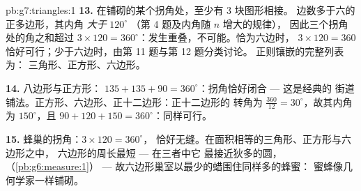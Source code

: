 \begin{solution}{pb:g7:triangles:1}
\textbf{13.} 在铺砌的某个拐角处，至少有 $3$ 块图形相接。
边数多于六的正多边形，其内角 \emph{大于} $120^\circ$
（第 4 题及内角随 $n$ 增大的规律），
因此三个拐角处的角之和超过
$3 \times 120 = 360^\circ$：发生重叠，不可能。恰为六边时，
$3 \times 120 = 360$ 恰好可行；少于六边时，由第 11 题与第 12 题分类讨论。
正则镶嵌的完整列表为：
三角形、正方形、六边形。

\textbf{14.} 八边形与正方形：
$135 + 135 + 90 = 360^\circ$：拐角恰好闭合 --- 这是经典的
街道铺法。正方形、六边形、正十二边形：正十二边形的
转角为 $\frac{360}{12} = 30^\circ$，故其内角为
$150^\circ$，且 $90 + 120 + 150 = 360^\circ$：同样可行。

\textbf{15.} 蜂巢的拐角：$3 \times 120 = 360^\circ$，
恰好无缝。在面积相等的三角形、正方形与六边形之中，
六边形的周长最短 --- 在三者中它
最接近狄多的圆，
（\cref{pb:g6:measure:1}） --- 故六边形巢室以最少的蜡围住同样多的蜂蜜：
蜜蜂像几何学家一样铺砌。
\end{solution}
